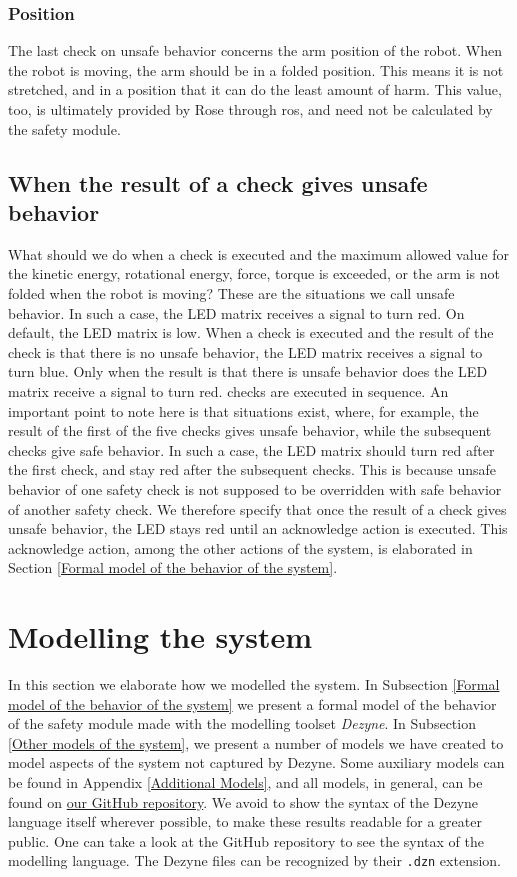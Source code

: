 \documentclass[12pt]{scrreprt}
\begin{document}
\subsubsection{Position}
The last check on unsafe behavior concerns the arm position of the robot. When the robot is moving, the arm should be in a folded position. This means it is not stretched, and in a position that it can do the least amount of harm. This value, too, is ultimately provided by Rose through \acrshort{ros}, and need not be calculated by the safety module.

\subsection{When the result of a check gives unsafe behavior}
\label{When the result of a check gives unsafe behavior}
What should we do when a check is executed and the maximum allowed value for the kinetic energy, rotational energy, force, torque is exceeded, or the arm is not folded when the robot is moving? 
These are the situations we call unsafe behavior. In such a case, the LED matrix receives a signal to turn red. On default, the LED matrix is low. When a check is executed and the result of the check is that there is no unsafe behavior, the LED matrix receives a signal to turn blue. Only when the result is that there is unsafe behavior does the LED matrix receive a signal to turn red. checks are executed in sequence. An important point to note here is that situations exist, where, for example, the result of the first of the five checks gives unsafe behavior, while the subsequent checks give safe behavior. In such a case, the LED matrix should turn red after the first check, and stay red after the subsequent checks. This is because unsafe behavior of one safety check is not supposed to be overridden with safe behavior of another safety check. We therefore specify that once the result of a check gives unsafe behavior, the LED stays red until an acknowledge action is executed. This acknowledge action, among the other actions of the system, is elaborated in Section \ref{Formal model of the behavior of the system}.

\newpage
\section{Modelling the system}
In this section we elaborate how we modelled the system. In Subsection \ref{Formal model of the behavior of the system} we present a formal model of the behavior of the safety module made with the modelling toolset \textit{Dezyne}. In Subsection \ref{Other models of the system}, we present a number of models we have created to model aspects of the system not captured by Dezyne. Some auxiliary models can be found in Appendix \ref{Additional Models}, and all models, in general, can be found on \href{https://github.com/Yousousen/safety-module-for-care-robot-rose.git}{our GitHub repository}. We avoid to show the syntax of the Dezyne language itself wherever possible, to make these results readable for a greater public. One can take a look at the GitHub repository to see the syntax of the modelling language. The Dezyne files can be recognized by their \texttt{.dzn} extension.
\end{document}
